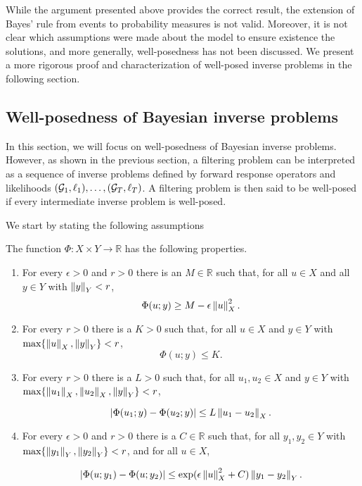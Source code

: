 While the argument presented above provides the correct result, the extension of Bayes' rule from events to probability measures is not valid. Moreover, it is not clear which assumptions were made about the model to ensure existence the solutions, and more generally, well-posedness has not been discussed. We present a more rigorous proof and characterization of well-posed inverse problems in the following section.

\subsection{Well-posedness of Bayesian inverse problems}

In this section, we will focus on well-posedness of Bayesian inverse problems. However, as shown in the previous section, a filtering problem can be interpreted as a sequence of inverse problems defined by forward response operators and likelihoods $(\mathcal{G}_1, \ell_1), \ldots, (\mathcal{G}_T, \ell_T)$. A filtering problem is then said to be well-posed if every intermediate inverse problem is well-posed.

We start by stating the following assumptions

\begin{assumption}\label{assumption-ll}
  The function $\Phi : X \times Y \rightarrow \mathbb{R}$ has the following properties.
  
  \begin{enumerate}
  \item For every $\epsilon > 0$ and $r > 0$ there is an $M \in \mathbb{R}$ such that, for all $u \in X$ and all $y \in Y$ with $\left\lVert y\right\rVert_Y < r$,
    \begin{equation*}
      \Phi(u; y) \ge M - \epsilon\left\lVert u\right\rVert_X^2.
    \end{equation*}
  \item For every $r > 0$ there is a $K > 0$ such that, for all $u \in X$ and $y \in Y$ with $\text{max}\{\left\lVert u\right\rVert_X, \left\lVert y\right\rVert_Y\} < r$,
    \begin{equation*}
      \Phi(u; y) \le K.
    \end{equation*}

  \item For every $r > 0$ there is a $L > 0$ such that, for all $u_1, u_2 \in X$ and $y \in Y$ with $\text{max}\{\left\lVert u_1\right\rVert_X, \left\lVert u_2\right\rVert_X, \left\lVert y\right\rVert_Y\} < r$,

    \begin{equation*}
      |\Phi(u_1; y) - \Phi(u_2; y)| \le L\left\lVert u_1 - u_2\right\rVert_X.
    \end{equation*}

  \item For every $\epsilon > 0$ and $r > 0$ there is a $C \in \mathbb{R}$ such that, for all $y_1, y_2 \in Y$ with $\text{max}\{\left\lVert y_1\right\rVert_Y, \left\lVert y_2\right\rVert_Y\} < r$, and for all $u \in X$,

    \begin{equation*}
      |\Phi(u; y_1) - \Phi(u; y_2)| \le \exp(\epsilon\left\lVert u\right\rVert_X^2 + C)\left\lVert y_1 - y_2\right\rVert_Y.
    \end{equation*}
  \end{enumerate}
\end{assumption}

